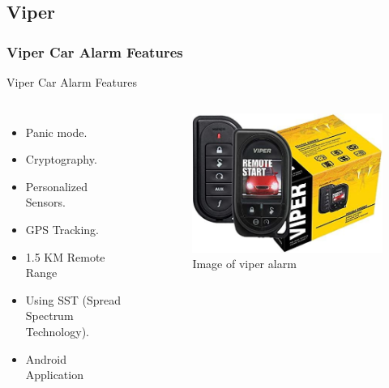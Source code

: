 \documentclass[aspectratio=169,11pt]{beamer}
\begin{document}
	\subsection{Viper}
	\begin{frame}
		\frametitle{Viper Car Alarm Features}
		\begin{block}{Viper Car Alarm Features}
			\begin{columns}[c]
				\begin{itemize}
					\item Panic mode.
					\item Cryptography.
					\item Personalized Sensors.
					\item GPS Tracking.
					\item 1.5 KM Remote Range
					\item Using SST (Spread Spectrum Technology).
					\item Android Application
				\end{itemize}\cite{viperCar35:online}
				\begin{figure}[!h]
					\centering
					\footnotesize
					\includegraphics[width=\textwidth]{../latex/images/viper_5906V_1.jpg}
					\caption{Image of viper alarm}
				\end{figure}
			\end{columns}
		\end{block}
	\end{frame}
\end{document}
